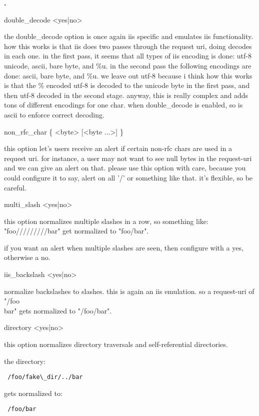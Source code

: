 \documentclass[english]{report}
\newcounter{slistnum}
\newenvironment{slist}{
    \begin{list}{
        {
            \bf \arabic{slistnum}.
        } 
    }{
        \usecounter{slistnum} 
    }
}{
    \end{list} 
}
\begin{document}
\begin{slist}
\item double\_decode <yes|no>

the double\_decode option is once again iis specific and emulates iis
functionality.  how this works is that iis does two passes through the request
uri, doing decodes in each one.  in the first pass, it seems that all types of
iis encoding is done: utf-8 unicode, ascii, bare byte, and \%u.  in the second
pass the following encodings are done:  ascii, bare byte, and \%u.  we leave out
utf-8 because i think how this works is that the \% encoded utf-8 is decoded to
the unicode byte in the first pass, and then utf-8 decoded in the second stage.
anyway, this is really complex and adds tons of different encodings for one
char.  when double\_decode is enabled, so is ascii to enforce correct decoding.

\item non\_rfc\_char \{ <byte> [<byte ...>] \}

this option let's users receive an alert if certain non-rfc chars are used in a
request uri.  for instance, a user may not want to see null bytes in the
request-uri and we can give an alert on that.  please use this option with
care, because you could configure it to say, alert on all '/' or something like
that.  it's flexible, so be careful.

\item multi\_slash <yes|no>

this option normalizes multiple slashes in a row, so something like:
"foo/////////bar" get normalized to "foo/bar".

if you want an alert when multiple slashes are seen, then configure with a yes,
otherwise a no.

\item iis\_backslash <yes|no>

normalize backslashes to slashes.  this is again an iis emulation.  so a
request-uri of "/foo\\bar" gets normalized to "/foo/bar".

\item directory <yes|no>

this option normalizes directory traversals and self-referential directories.

the directory:
\begin{verbatim} /foo/fake\_dir/../bar \end{verbatim}
gets normalized to:
\begin{verbatim} /foo/bar \end{verbatim}


\end{slist}
\end{document}
